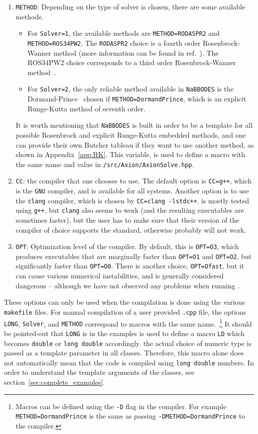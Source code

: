 \documentclass[11pt,a4paper]{article}
\begin{document}
\begin{enumerate}
	\item {\tt METHOD}: Depending on the type of solver is chosen, there are some available methods. 
		\begin{itemize}
			\item 	For {\tt Solver=1}, the available methods are 
			{\tt METHOD=RODASPR2} and {\tt METHOD=ROS34PW2}. The {\tt RODASPR2} choice is a fourth order Rosenbrock-Wanner method (more information can be found in ref.~\cite{RANG2015128}). The {ROS34PW2} choice corresponds to a third order Rosenbrock-Wanner method~\cite{RangAngermann2005}. 
			\item 	For {\tt Solver=2}, the only reliable method available in {\tt NaBBODES} is the Dormand-Prince~\cite{DORMAND198019} chosen if {\tt METHOD=DormandPrince}, which is an explicit Runge-Kutta method of seventh order.
		\end{itemize}
		It is worth mentioning that {\tt NaBBODES} is built in order to be a template for all possible Rosenbrock and explicit Runge-Kutta embedded methods, and one can provide their own Butcher tableau if they want to use another method, as shown in Appendix~\ref{app:RK}. This variable, is used to define a macro with the same name and value in {\tt \mimes/src/Axion/AxionSolve.hpp}.
	\item {\tt CC}: the \CPP compiler that one chooses to use. The default option is {\tt CC=g++}, which is the {\tt GNU} \CPP compiler, and is available for all systems. Another option is to use the {\tt clang} compiler, which is chosen by {\tt CC=clang -lstdc++}. \mimes is mostly tested using {\tt g++}, but {\tt clang} also seems to work (and the resulting executables are sometimes faster), but the user has to make sure that their version of the compiler of choice supports the  standard, otherwise \mimes probably will not work.
	\item {\tt OPT}: Optimization level of the compiler. By default, this is {\tt OPT=O3}, which produces executables that are marginally faster than {\tt OPT=O1} and {\tt OPT=O2}, but significantly faster than {\tt OPT=O0}. There is another choice, {\tt OPT=Ofast}, but it can cause various numerical instabilities, and is generally considered dangerous -- although we have not observed any problems when running \mimes. 
\end{enumerate}
%
These options can only be used when the compilation is done using the various {\tt makefile} files. For manual compilation of a user provided {\tt .cpp} file, the options {\tt LONG}, {\tt Solver}, and {\tt METHOD} correspond to macros with the same name.~\footnote{Macros can be defined using the {\tt -D} flag
in the compiler. For example {\tt METHOD=DormandPrince} is the same as passing {\tt -DMETHOD=DormandPrince} to the compiler.} It should be pointed-out that {\tt LONG} is in the examples is used to define a macro {\tt LD} which becomes {\tt double} or {\tt long double} accordingly. the actual choice of numeric type is passed as a template parameter in all classes. Therefore, this macro alone does not automatically mean that the code is compiled using {\tt long double} numbers. In order to understand the template arguments of the classes, see section~\ref{sec:complete_examples}. 
\end{document}
